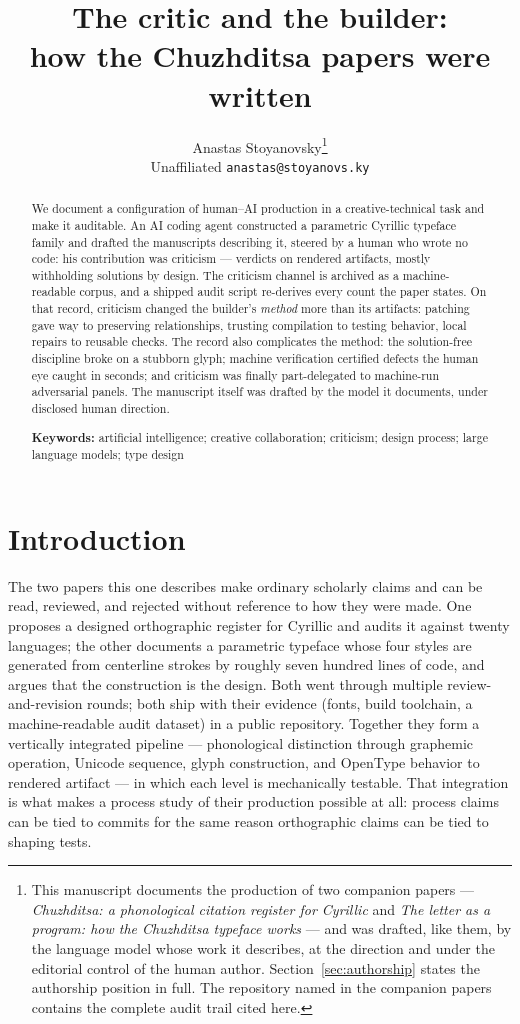 \documentclass[12pt]{article}
\title{\textbf{The critic and the builder:\\ how the Chuzhditsa papers were written}}
\author{Anastas Stoyanovsky\thanks{This manuscript documents the production of two companion papers — \emph{Chuzhditsa: a phonological citation register for Cyrillic} and \emph{The letter as a program: how the Chuzhditsa typeface works} — and was drafted, like them, by the language model whose work it describes, at the direction and under the editorial control of the human author. Section~\ref{sec:authorship} states the authorship position in full. The repository named in the companion papers contains the complete audit trail cited here.}\\[3pt] {\normalsize Unaffiliated \quad \texttt{anastas@stoyanovs.ky}}}
\date{}
\begin{document}
\maketitle
\onehalfspacing

\begin{abstract}
\noindent We document a configuration of human--AI production in a creative-technical task and make it auditable. An AI coding agent constructed a parametric Cyrillic typeface family and drafted the manuscripts describing it, steered by a human who wrote no code: his contribution was criticism — verdicts on rendered artifacts, mostly withholding solutions by design. The criticism channel is archived as a machine-readable corpus, and a shipped audit script re-derives every count the paper states. On that record, criticism changed the builder's \emph{method} more than its artifacts: patching gave way to preserving relationships, trusting compilation to testing behavior, local repairs to reusable checks. The record also complicates the method: the solution-free discipline broke on a stubborn glyph; machine verification certified defects the human eye caught in seconds; and criticism was finally part-delegated to machine-run adversarial panels. The manuscript itself was drafted by the model it documents, under disclosed human direction.

\medskip
\noindent\textbf{Keywords:} artificial intelligence; creative collaboration; criticism; design process; large language models; type design
\end{abstract}

\section{Introduction}

The two papers this one describes make ordinary scholarly claims and can be read, reviewed, and rejected without reference to how they were made. One proposes a designed orthographic register for Cyrillic and audits it against twenty languages; the other documents a parametric typeface whose four styles are generated from centerline strokes by roughly seven hundred lines of code, and argues that the construction is the design. Both went through multiple review-and-revision rounds; both ship with their evidence (fonts, build toolchain, a machine-readable audit dataset) in a public repository. Together they form a vertically integrated pipeline — phonological distinction through graphemic operation, Unicode sequence, glyph construction, and OpenType behavior to rendered artifact — in which each level is mechanically testable. That integration is what makes a process study of their production possible at all: process claims can be tied to commits for the same reason orthographic claims can be tied to shaping tests.
\end{document}
